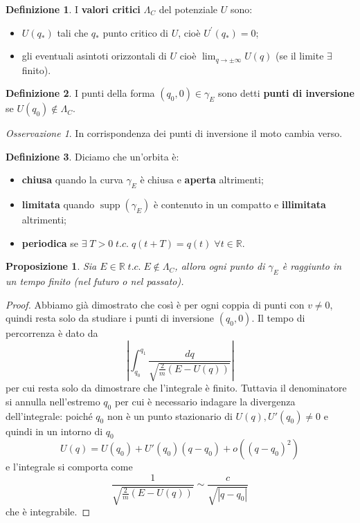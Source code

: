 \documentclass{book}
\theoremstyle{plain}
\theoremstyle{plain}
\theoremstyle{plain}
\theoremstyle{plain}
\theoremstyle{plain}
\newtheorem{prop}{Proposizione}[chapter]
\theoremstyle{definition}
\newtheorem{defi}{Definizione}[chapter]
\theoremstyle{remark}
\newtheorem*{oss}{Osservazione}
\theoremstyle{definition}
\begin{document}
\begin{defi}
\everymath{\displaystyle}
    I \textbf{valori critici} $\Lambda_C$ del potenziale $U$ sono:
    \begin{itemize}
        \item $U(q_*)$ tali che $q_*$ punto critico di $U$, cioè $U^{\prime}(q_*)=0$;
        \item gli eventuali asintoti orizzontali di $U$ cioè $\lim_{q\to\pm\infty}U(q)$ (se il limite $\exists$ finito).
    \end{itemize}
\end{defi}

\begin{defi}
    I punti della forma $(q_0,0)\in\gamma_E$ sono detti \textbf{punti di inversione} se $U(q_0)\notin \Lambda_C$.
\end{defi}

\begin{oss}
    In corrispondenza dei punti di inversione il moto cambia verso.
\end{oss}

\begin{defi}
    Diciamo che un'orbita è:
    \begin{itemize}
        \item \textbf{chiusa} quando la curva $\gamma_E$ è chiusa e \textbf{aperta} altrimenti;
        \item \textbf{limitata} quando $\operatorname{supp}(\gamma_E)$ è contenuto in un compatto e \textbf{illimitata} altrimenti;
        \item \textbf{periodica} se $\exists \; T>0 \; t.c. \; q(t+T)=q(t) \; \forall t\in \mathbb{R}$.
    \end{itemize}
\end{defi}

\begin{prop}
    Sia $E\in\mathbb{R} \; t.c. \; E \notin\Lambda_C$, allora ogni punto di $\gamma_E$ è raggiunto in un tempo finito (nel futuro o nel passato).
\end{prop}

\begin{proof}
    Abbiamo già dimostrato che così è per ogni coppia di punti con $v\neq0$, quindi resta solo da studiare i punti di inversione $(q_0,0)$. Il tempo di percorrenza è dato da
    \begin{displaymath}
        \left|\int_{q_0}^{q_1}\frac{dq}{\sqrt{\frac{2}{m}(E-U(q))}}\right|
    \end{displaymath}
    per cui resta solo da dimostrare che l'integrale è finito. Tuttavia il denominatore si annulla nell'estremo $q_0$ per cui è necessario indagare la divergenza dell'integrale: poiché $q_0$ non è un punto stazionario di $U(q), U'(q_0)\neq0$ e quindi in un intorno di $q_0$
    \begin{displaymath}
        U(q)=U(q_0)+U'(q_0)(q-q_0)+o((q-q_0)^2)
    \end{displaymath}
    e l'integrale si comporta come
    \begin{displaymath}
        \frac{1}{\sqrt{\frac{2}{m}(E-U(q))}}\sim\frac{c}{\sqrt{|q-q_0|}}
    \end{displaymath}
    che è integrabile.
\end{proof}
\end{document}
